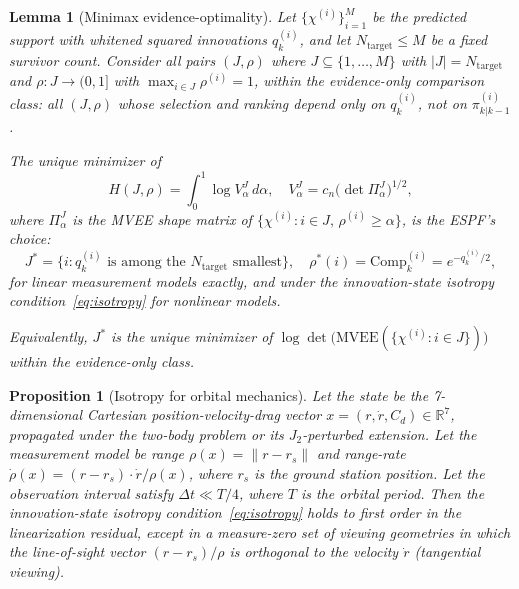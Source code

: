 \documentclass[10pt,a4paper]{amsart}
\newtheorem{lemma}{Lemma}
\newtheorem{proposition}{Proposition}
\begin{document}
\begin{lemma}[Minimax evidence-optimality]
\label{lem:minimax}
Let $\{\chi^{(i)}\}^M_{i=1}$ be the predicted support with whitened squared innovations $q^{(i)}_k$, and let $N_{\mathrm{target}} \leq M$ be a fixed survivor count. Consider all pairs $(J,\rho)$ where $J \subseteq \{1,\ldots,M\}$ with $|J| = N_{\mathrm{target}}$ and $\rho : J \to (0,1]$ with $\max_{i\in J}\rho^{(i)} = 1$, within the evidence-only comparison class: all $(J,\rho)$ whose selection and ranking depend only on $q^{(i)}_k$, not on $\pi^{(i)}_{k|k-1}$.

The unique minimizer of
\begin{equation}
H(J,\rho) = \int_0^1 \log V^J_\alpha\,d\alpha,\quad V^J_\alpha = c_n\bigl(\det\Pi^J_\alpha\bigr)^{1/2},
\end{equation}
where $\Pi^J_\alpha$ is the MVEE shape matrix of $\{\chi^{(i)} : i \in J,\, \rho^{(i)} \geq \alpha\}$, is the ESPF's choice:
\begin{equation}
J^* = \bigl\{i : q^{(i)}_k \text{ is among the } N_{\mathrm{target}} \text{ smallest}\bigr\},\quad \rho^*(i) = \mathrm{Comp}^{(i)}_k = e^{-q^{(i)}_k/2},
\end{equation}
for linear measurement models exactly, and under the innovation-state isotropy condition~\eqref{eq:isotropy} for nonlinear models.

Equivalently, $J^*$ is the unique minimizer of $\log\det\bigl(\mathrm{MVEE}(\{\chi^{(i)} : i \in J\})\bigr)$ within the evidence-only class.
\end{lemma}

\begin{proposition}[Isotropy for orbital mechanics]
\label{prop:isotropy}
Let the state be the 7-dimensional Cartesian position-velocity-drag vector $x = (r, \dot{r}, C_d) \in \mathbb{R}^7$, propagated under the two-body problem or its $J_2$-perturbed extension. Let the measurement model be range $\rho(x) = \|r - r_s\|$ and range-rate $\dot{\rho}(x) = (r - r_s)\cdot\dot{r}/\rho(x)$, where $r_s$ is the ground station position. Let the observation interval satisfy $\Delta t \ll T/4$, where $T$ is the orbital period. Then the innovation-state isotropy condition~\eqref{eq:isotropy} holds to first order in the linearization residual, except in a measure-zero set of viewing geometries in which the line-of-sight vector $(r - r_s)/\rho$ is orthogonal to the velocity $\dot{r}$ (tangential viewing).
\end{proposition}
\end{document}
